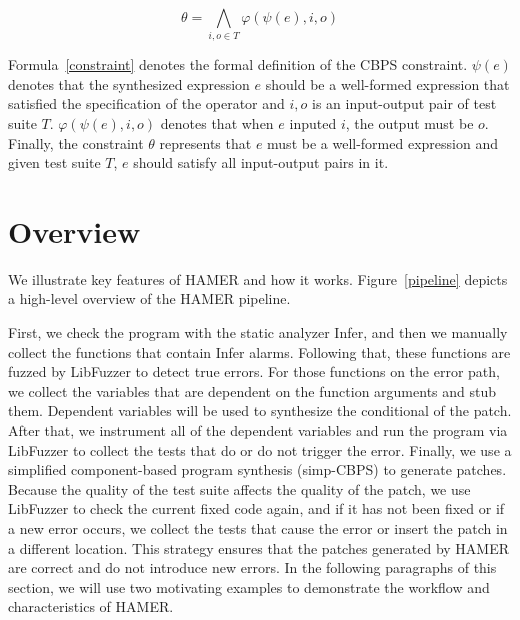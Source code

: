 \documentclass[a4paper,11pt,oneside,openany]{book}
\begin{document}
\begin{equation}
\label{constraint}
\theta=\bigwedge_{i,o\in T}^{}\varphi(\psi(e),i,o)
\end{equation}

Formula~\ref{constraint} denotes the formal definition of the CBPS constraint. $\psi(e)$ denotes that the synthesized expression $e$ should be a well-formed expression that satisfied the specification of the operator and $i,o$ is an input-output pair of test suite $T$. $\varphi(\psi(e),i,o)$ denotes that when $e$ inputed $i$, the output must be $o$. Finally, the constraint $\theta$ represents that $e$ must be a well-formed expression and given test suite $T$, $e$ should satisfy all input-output pairs in it.

\chapter{Overview}
\label{overview}
We illustrate key features of HAMER and how it works. Figure~\ref{pipeline} depicts a high-level overview of the HAMER pipeline.

First, we check the program with the static analyzer \mbox{Infer}, and then we manually collect the functions that contain Infer alarms. Following that, these functions are fuzzed by LibFuzzer to detect true errors.  For those functions on the error path, we collect the variables that are dependent on the function arguments and stub them. Dependent variables will be used to synthesize the conditional of the patch. After that, we instrument all of the dependent variables and run the program via LibFuzzer to collect the tests that do or do not trigger the error. Finally, we use a simplified component-based program synthesis (simp-CBPS) to generate patches. Because the quality of the test suite affects the quality of the patch, we use LibFuzzer to check the current fixed code again, and if it has not been fixed or if a new error occurs, we collect the tests that cause the error or insert the patch in a different location. This strategy ensures that the patches generated by HAMER are correct and do not introduce new errors. In the following paragraphs of this section, we will use two motivating examples to demonstrate the workflow and characteristics of HAMER.
\end{document}
